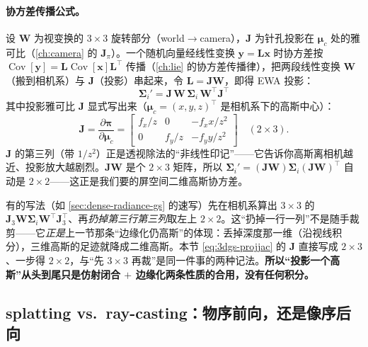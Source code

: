 \paragraph{协方差传播公式。}
设 $\mathbf W$ 为视变换的 $3\times3$ 旋转部分（world$\to$camera），$\mathbf J$ 为针孔投影在 $\boldsymbol\mu_c$ 处的雅可比（\cref{ch:camera} 的 $\mathbf J_\pi$）。一个随机向量经线性变换 $\mathbf y=\mathbf L\mathbf x$ 时协方差按 $\operatorname{Cov}[\mathbf y]=\mathbf L\operatorname{Cov}[\mathbf x]\mathbf L^\top$ 传播（\cref{ch:lie} 的协方差传播律），把两段线性变换 $\mathbf W$（搬到相机系）与 $\mathbf J$（投影）串起来，令 $\mathbf L=\mathbf J\mathbf W$，即得 EWA 投影：
\begin{equation}
  \boxed{\;\boldsymbol\Sigma_i'=\mathbf J\,\mathbf W\,\boldsymbol\Sigma_i\,\mathbf W^\top\mathbf J^\top\;}
  \label{eq:3dgs-proj}
\end{equation}
其中投影雅可比 $\mathbf J$ 显式写出来（$\boldsymbol\mu_c=(x,y,z)^\top$ 是相机系下的高斯中心）：
\begin{equation}
  \mathbf J=\frac{\partial\boldsymbol\pi}{\partial\boldsymbol\mu_c}=
  \begin{bmatrix} f_x/z & 0 & -f_x x/z^2\\[2pt] 0 & f_y/z & -f_y y/z^2\end{bmatrix}\quad(2\times3).
  \label{eq:3dgs-projjac}
\end{equation}
$\mathbf J$ 的第三列（带 $1/z^2$）正是透视除法的“非线性印记”——它告诉你高斯离相机越近、投影放大越剧烈。$\mathbf J\mathbf W$ 是个 $2\times3$ 矩阵，所以 $\boldsymbol\Sigma_i'=(\mathbf J\mathbf W)\boldsymbol\Sigma_i(\mathbf J\mathbf W)^\top$ 自动是 $2\times2$——这正是我们要的屏空间二维高斯协方差。

\begin{insight}
有的写法（如 \cref{sec:dense-radiance-gs} 的速写）先在相机系算出 $3\times3$ 的 $\mathbf J_{3}\mathbf W\boldsymbol\Sigma_i\mathbf W^\top\mathbf J_{3}^\top$、再\emph{扔掉第三行第三列}取左上 $2\times2$。这“扔掉一行一列”不是随手裁剪——它\emph{正是}上一节那条“边缘化仍高斯”的体现：丢掉深度那一维（沿视线积分），三维高斯的足迹就降成二维高斯。本节 \cref{eq:3dgs-projjac} 的 $\mathbf J$ 直接写成 $2\times3$、一步得 $2\times2$，与“先 $3\times3$ 再裁”是同一件事的两种记法。\textbf{所以“投影一个高斯”从头到尾只是仿射闭合 $+$ 边缘化两条性质的合用，没有任何积分。}
\end{insight}

\subsection{splatting vs.\ ray-casting：物序前向，还是像序后向}

